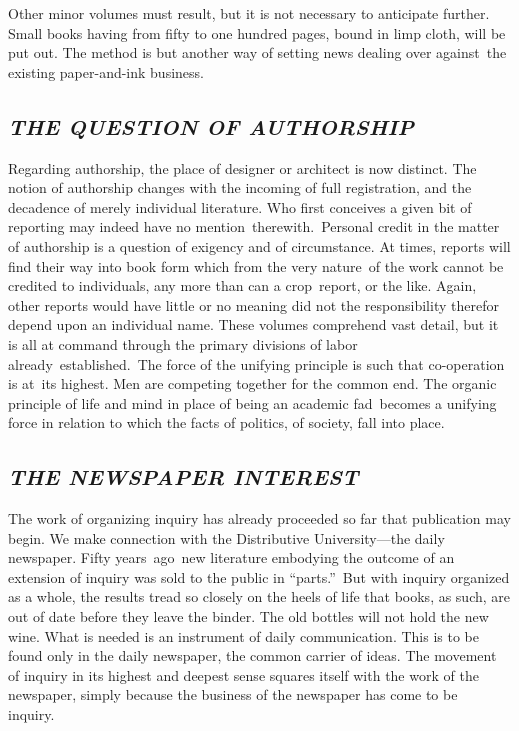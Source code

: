 \documentclass[openany,nobib]{tufte-book}
\begin{document}
\vspace{.05in}

Other minor volumes must result, but it is not necessary to anticipate
further. Small books having from fifty to one hundred pages, bound in
limp cloth, will be put out. The method is but another way of setting
news dealing over against~the existing paper-and-ink business. ~

\hypertarget{the-question-of-authorship}{%
\subsection{\texorpdfstring{\emph{THE QUESTION OF
AUTHORSHIP}}{THE QUESTION OF AUTHORSHIP}}\label{the-question-of-authorship}}

Regarding authorship, the place of designer or architect is now
distinct. The notion of authorship changes with the incoming of full
registration, and the decadence of merely individual literature. Who
first conceives a given bit of reporting may indeed have no
mention~therewith.~Personal credit in the matter of authorship is a
question of exigency and of circumstance. At times, reports will find
their way into book form which from the very nature~of the work cannot
be credited to individuals, any more than can a crop~report, or the
like. Again, other reports would have little or no meaning did not the
responsibility therefor depend upon an individual name. These volumes
comprehend vast detail, but it is all at command through the primary
divisions of labor already~established.~The force of the unifying
principle is such that co-operation is at~its highest. Men are competing
together for the common end. The organic principle of life and mind in
place of being an academic fad~becomes a unifying force in relation to
which the facts of politics, of society, fall into place.~~

\hypertarget{the-newspaper-interest}{%
\subsection{\texorpdfstring{\emph{THE NEWSPAPER
INTEREST}}{THE NEWSPAPER INTEREST}}\label{the-newspaper-interest}}

The work of organizing inquiry has already proceeded so far that
publication may begin. We make connection with the Distributive
University---the daily newspaper. Fifty years~ago~new literature
embodying the outcome of an extension of inquiry was sold to the public
in ``parts.''~But with inquiry organized as a whole, the results tread
so closely on the heels of life that books, as such, are out of date
before they leave the binder. The old bottles will not hold the new
wine. What is needed is an instrument of daily communication. This is to
be found only in the daily newspaper, the common carrier of ideas. The
movement of inquiry in its highest and deepest sense squares itself with
the work of the newspaper, simply because the business of the newspaper
has come to be inquiry.~
\end{document}
